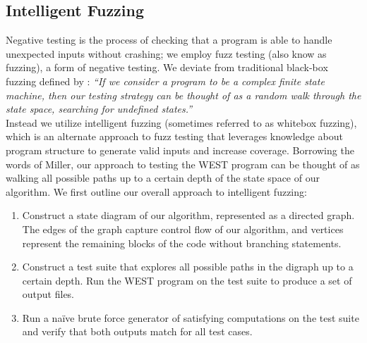 \documentclass[runningheads]{llncs}
\begin{document}
\subsection{Intelligent Fuzzing}
Negative testing is the process of checking that a program is able to handle unexpected inputs without crashing; we employ fuzz testing (also know as fuzzing), a form of negative testing. We deviate from traditional black-box fuzzing defined by \cite{Miller}:
\textit{``If we consider a program to
be a complex finite state machine, then our testing strategy can be thought of as a random walk through the state space, searching for undefined states.''}\\
Instead we utilize intelligent fuzzing (sometimes referred to as whitebox fuzzing), which is an alternate approach to fuzz testing that leverages knowledge about program structure to generate valid inputs and increase coverage. 
Borrowing the words of Miller, our approach to testing the WEST program can be thought of as walking all possible paths up to a certain depth of the state space of our algorithm. 
We first outline our overall approach to intelligent fuzzing: 
\begin{enumerate}
    \item Construct a state diagram of our algorithm, represented as a directed graph. 
    The edges of the graph capture control flow of our algorithm, and vertices represent the remaining blocks of the code without branching statements.  
    \item Construct a test suite that explores all possible paths in the digraph up to a certain depth. Run the WEST program on the test suite to produce a set of output files.
    \item Run a na\"ive brute force generator of satisfying computations on the test suite and verify that both outputs match for all test cases.
\end{enumerate}
\end{document}
